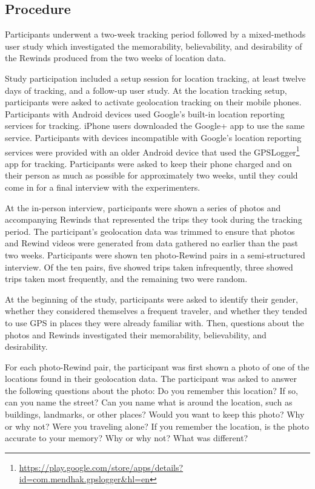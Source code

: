 \documentclass{sigchi}
\begin{document}
\subsection{Procedure}
Participants underwent a two-week tracking period followed by a mixed-methods user study which investigated the memorability, believability, and desirability of the Rewinds produced from the two weeks of location data.

Study participation included a setup session for location tracking, at least twelve days of tracking, and a follow-up user study. At the location tracking setup, participants were asked to activate geolocation tracking on their mobile phones. Participants with Android devices used Google's built-in location reporting services for tracking. iPhone users downloaded the Google+ app to use the same service. Participants with devices incompatible with Google's location reporting services were provided with an older Android device that used the GPSLogger\footnote{\url{https://play.google.com/store/apps/details?id=com.mendhak.gpslogger&hl=en}} app for tracking. Participants were asked to keep their phone charged and on their person as much as possible for approximately two weeks, until they could come in for a final interview with the experimenters.

At the in-person interview, participants were shown a series of photos and accompanying Rewinds that represented the trips they took during the tracking period. The participant's geolocation data was trimmed to ensure that photos and Rewind videos were generated from data gathered no earlier than the past two weeks. Participants were shown ten photo-Rewind pairs in a semi-structured interview.  Of the ten pairs, five showed trips taken infrequently, three showed trips taken most frequently, and the remaining two were random. 

At the beginning of the study, participants were asked to identify their gender, whether they considered themselves a frequent traveler, and whether they tended to use GPS in places they were already familiar with.
Then, questions about the photos and Rewinds investigated their memorability, believability, and desirability.

For each photo-Rewind pair, the participant was first shown a photo of one of the locations found in their geolocation data. The participant was asked to answer the following questions about the photo: Do you remember this location? If so, can you name the street? Can you name what is around the location, such as buildings, landmarks, or other places? Would you want to keep this photo? Why or why not? Were you traveling alone? If you remember the location, is the photo accurate to your memory? Why or why not? What was different?
\end{document}

